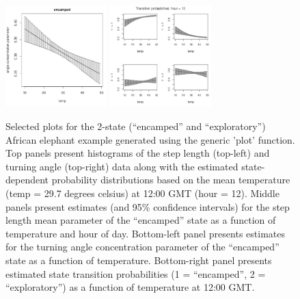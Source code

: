 \documentclass[12pt]{article}\usepackage[]{graphicx}\usepackage[]{xcolor}
\begin{document}
\begin{figure}[htbp]
  \includegraphics[width=0.35\textwidth]{plot_elephantResults010.pdf}
  \includegraphics[width=0.35\textwidth]{plot_elephantResults013.pdf} \\
  \caption{Selected plots for the 2-state (``encamped'' and ``exploratory'') African elephant example generated using the generic 'plot' function. Top panels present histograms of the step length (top-left) and turning angle (top-right) data along with the estimated state-dependent probability distributions based on the mean temperature (temp = 29.7 degrees celsius) at 12:00 GMT (hour = 12). Middle panels present estimates (and 95\% confidence intervals) for the step length mean parameter of the ``encamped'' state as a function of temperature and hour of day.  Bottom-left panel presents estimates for the turning angle concentration parameter of the ``encamped'' state as a function of temperature.  Bottom-right panel presents estimated state transition probabilities (1 = ``encamped'', 2 = ``exploratory'') as a function of temperature at 12:00 GMT.}
  \label{fig:elephantResults2}
\end{figure}
\end{document}
